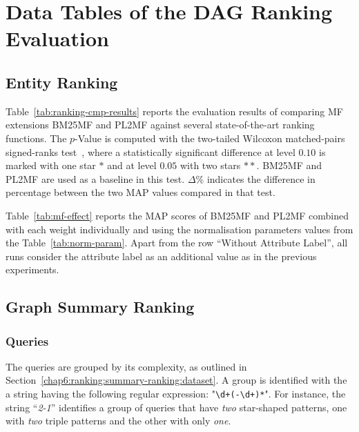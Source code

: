 \chapter{Data Tables of the DAG Ranking Evaluation}

\section{Entity Ranking}

Table~\ref{tab:ranking-cmp-results} reports the evaluation results of comparing \gls{MF} extensions \gls{BM25MF} and \gls{PL2MF} against several state-of-the-art ranking functions. The $p$-Value is computed with the two-tailed Wilcoxon matched-pairs signed-ranks test~\cite{sheskin:2003:CRC,buttcher:2010:IRI:1869919}, where a statistically significant difference at level $0.10$ is marked with one star $*$ and at level $0.05$ with two stars $**$. \gls{BM25MF} and \gls{PL2MF} are used as a baseline in this test. $\Delta\%$ indicates the difference in percentage between the two MAP values compared in that test.




Table~\ref{tab:mf-effect} reports the MAP scores of \gls{BM25MF} and \gls{PL2MF} combined with each weight individually and using the normalisation parameters values from the Table~\ref{tab:norm-param}. Apart from the row ``Without Attribute Label'', all runs consider the attribute label as an additional value as in the previous experiments.



\section{Graph Summary Ranking}
\label{appendix:ranking}

\subsection{Queries}

The queries are grouped by its complexity, as outlined in Section~\ref{chap6:ranking:summary-ranking:dataset}. A group is identified with the a string having the following regular expression: "\verb/\d+(-\d+)*/". For instance, the string ``\emph{2-1}'' identifies a group of queries that have \textit{two} star-shaped patterns, one with \textit{two} triple patterns and the other with only \textit{one}.

